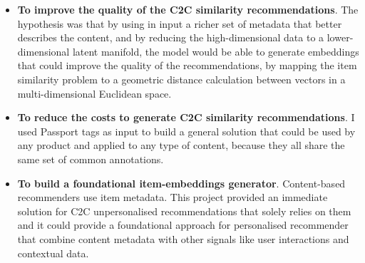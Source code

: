 \begin{itemize}
  \item \textbf{To improve the quality of the C2C similarity recommendations}. The hypothesis was that by using in input a richer set of metadata that
  better describes the content, and by reducing the high-dimensional data to a lower-dimensional latent manifold,
  the model would be able to generate embeddings that could improve the quality of the recommendations, by mapping the
  item similarity problem to a geometric distance calculation between vectors in a multi-dimensional Euclidean space.
  \item \textbf{To reduce the costs to generate C2C similarity recommendations}. I used Passport tags as input to build a general solution
  that could be used by any product and applied to any type of content, because they all share the same set of common annotations.
  \item \textbf{To build a foundational item-embeddings generator}. Content-based recommenders
  use item metadata. This project provided an immediate solution for C2C unpersonalised recommendations that solely relies on them and
  it could provide a foundational approach for personalised recommender that combine content metadata with other signals like user interactions
  and contextual data.
\end{itemize}
